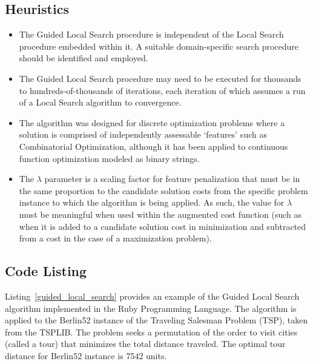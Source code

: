 \subsection{Heuristics}
\begin{itemize}
	\item The Guided Local Search procedure is independent of the Local Search procedure embedded within it. A suitable domain-specific search procedure should be identified and employed.
	\item The Guided Local Search procedure may need to be executed for thousands to hundreds-of-thousands of iterations, each iteration of which assumes a run of a Local Search algorithm to convergence.
	\item The algorithm was designed for discrete optimization problems where a solution is comprised of independently assessable `features' such as Combinatorial Optimization, although it has been applied to continuous function optimization modeled as binary strings.
	\item The $\lambda$ parameter is a scaling factor for feature penalization that must be in the same proportion to the candidate solution costs from the specific problem instance to which the algorithm is being applied. As such, the value for $\lambda$ must be meaningful when used within the augmented cost function (such as when it is added to a candidate solution cost in minimization and subtracted from a cost in the case of a maximization problem).
\end{itemize}

\subsection{Code Listing}
Listing~\ref{guided_local_search} provides an example of the Guided Local Search algorithm implemented in the Ruby Programming Language. 
The algorithm is applied to the Berlin52 instance of the Traveling Salesman Problem (TSP), taken from the TSPLIB. The problem seeks a permutation of the order to visit cities (called a tour) that minimizes the total distance traveled. The optimal tour distance for Berlin52 instance is 7542 units.

